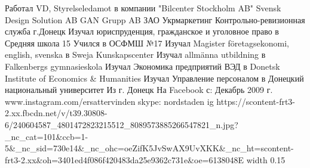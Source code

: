  
 
 
 
 

\par
Работал VD, Styrelseledamot в компании "Bilcenter Stockholm AB"
Svensk Design Solution AB
GAN Grupp AB
ЗАО Укрмаркетинг
Контрольно-ревизионная служба г.Донецк
Изучал юриспруденция, гражданское и уголовное право в Средняя школа 15
Учился в ОСФМШ №17
Изучал Magister företagsekonomi, english, svenska в Sweja Kunskapscenter
Изучал allmänna utbildning в Falkenbergs gymnasieskola
Изучал Экономика предприятий ВЭД в Donetsk Institute of Economics \& Humanities
Изучал Управление персоналом в Донецкий национальный университет
Из г. Донецк
На Facebook с: Декабрь 2009 г.
www.instagram.com/ersattervinden
skype: nordstaden
\ifcmt
  ig https://scontent-frt3-2.xx.fbcdn.net/v/t39.30808-6/240604587_4801472823215512_8089573885266547821_n.jpg?_nc_cat=101&ccb=1-5&_nc_sid=730e14&_nc_ohc=oeZifK5JvSwAX9UvXKK&_nc_ht=scontent-frt3-2.xx&oh=3401ed4f086f420483da25e9362c731e&oe=6138048E
  width 0.15
\fi

